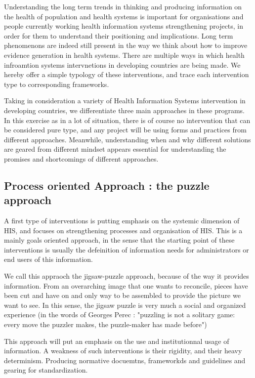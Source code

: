 \documentclass[letterpaper, 10 pt, conference]{IEEEconf}  %
\begin{document}
Understanding the long term trends in thinking and producing information on the health of population and health systems is important for organisations and people currently working health information systems strengthening projects, in order for them to understand their positioning and implications. Long term phenomenons are indeed still present in the way we think about how to improve evidence generation in health systems. There are multiple ways in which health infroamtion systems intervnetions in developing countries are being made. We hereby offer a simple typology of these interventions, and trace each intervention type to corresponding frameworks.

Taking in consideration a variety of Health Information Systems intervention in developing countries, we differentiate three main approaches in these programs. In this exercise as in a lot of situation, there is of course no intervention that can be considered pure type, and any project will be using forms and practices from different approaches. Meanwhile, understanding when and why different solutions are geared from different mindset appears essential for understanding the promises and shortcomings of different approaches.

\subsection{Process oriented Approach : the puzzle approach}

A first type of interventions is putting emphasis on the systemic dimension of HIS, and focuses on strengthening processes and organisation of HIS. This is a mainly goals oriented approach, in the sense that the starting point of these interventions is usually the defeinition of information needs for administrators or end users of this information.

We call this appraoch the jigsaw-puzzle approach, because of the way it provides information. From an overarching image that one wants to reconcile, pieces have been cut and have on and only way to be assembled to provide the picture we want to see. In this sense, the jigsaw puzzle is very much a social and organized experience (in the words of Georges Perec : "puzzling is not a solitary game: every move the puzzler makes, the puzzle-maker has made before")

This approach will put an emphasis on the use and institutionnal usage of information. A weakness of such interventions is their rigidity, and their heavy determinism. Producing normative docuemtns, frameworkds and guidelines and gearing for standardization.
\end{document}
